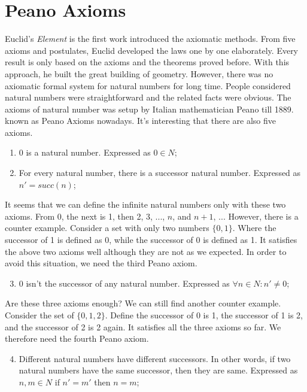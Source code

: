 \documentclass[b5paper]{article}
\begin{document}
\section{Peano Axioms}

Euclid's {\em Element} is the first work introduced the axiomatic methods. From five axioms and postulates, Euclid developed the laws one by one elaborately. Every result is only based on the axioms and the theorems proved before. With this approach, he built the great building of geometry. However, there was no axiomatic formal system for natural numbers for long time. People considered natural numbers were straightforward and the related facts were obvious. The axioms of natural number was setup by Italian mathematician Peano till 1889. known as Peano Axioms nowadays. It's interesting that there are also five axioms.

\begin{enumerate}
\item 0 is a natural number. Expressed as $0 \in N$;
\item For every natural number, there is a successor natural number. Expressed as $n' = succ(n)$;
\end{enumerate}

It seems that we can define the infinite natural numbers only with these two axioms. From 0, the next is 1, then 2, 3, ..., $n$, and $n+1$, ... However, there is a counter example. Consider a set with only two numbers $\{0, 1\}$. Where the successor of 1 is defined as 0, while the successor of 0 is defined as 1. It satisfies the above two axioms well although they are not as we expected. In order to avoid this situation, we need the third Peano axiom.

\begin{enumerate}
  \setcounter{enumi}{2}
  \item 0 isn't the successor of any natural number. Expressed as $\forall n \in N: n' \neq 0$;
\end{enumerate}

Are these three axioms enough? We can still find another counter example. Consider the set of $\{0, 1, 2\}$. Define the successor of 0 is 1, the successor of 1 is 2, and the successor of 2 is 2 again. It satisfies all the three axioms so far. We therefore need the fourth Peano axiom.

\begin{enumerate}
  \setcounter{enumi}{3}
  \item Different natural numbers have different successors. In other words, if two natural numbers have the same successor, then they are same. Expressed as $n, m \in N$ if $n' = m'$ then $n = m$;
\end{enumerate}
\end{document}
